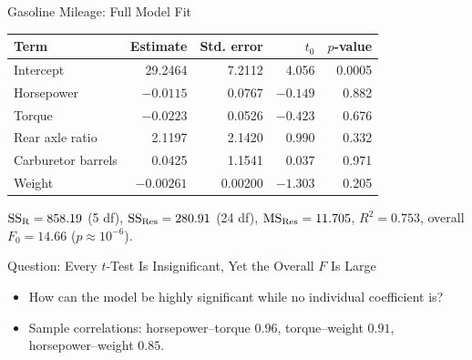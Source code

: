 \begin{frame}{Gasoline Mileage: Full Model Fit}
    \begin{center}
        \small
        \begin{tabular}{lrrrr}
            \toprule
            Term & Estimate & Std. error & $t_0$ & $p$-value \\
            \midrule
            Intercept & 29.2464 & 7.2112 & 4.056 & 0.0005 \\
            Horsepower & $-0.0115$ & 0.0767 & $-0.149$ & 0.882 \\
            Torque & $-0.0223$ & 0.0526 & $-0.423$ & 0.676 \\
            Rear axle ratio & 2.1197 & 2.1420 & 0.990 & 0.332 \\
            Carburetor barrels & 0.0425 & 1.1541 & 0.037 & 0.971 \\
            Weight & $-0.00261$ & 0.00200 & $-1.303$ & 0.205 \\
            \bottomrule
        \end{tabular}
    \end{center}
    $\mathrm{SS}_{\mathrm{R}}=858.19$ (5 df), $\mathrm{SS}_{\mathrm{Res}}=280.91$ (24 df), $\mathrm{MS}_{\mathrm{Res}}=11.705$, $R^2=0.753$, overall $F_0=14.66$ ($p\approx10^{-6}$).
\end{frame}


\begin{frame}{Question: Every $t$-Test Is Insignificant, Yet the Overall $F$ Is Large}
    \begin{itemize}
        \item How can the model be highly significant while no individual coefficient is?
        \item Sample correlations: horsepower--torque $0.96$, torque--weight $0.91$, horsepower--weight $0.85$.
    \end{itemize}
\end{frame}


